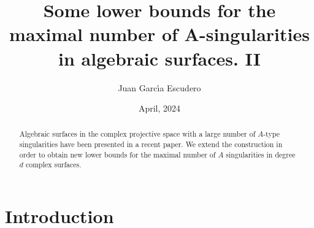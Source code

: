 \documentclass{birkjour_t2}
\theoremstyle{definition}
\theoremstyle{remark}
\numberwithin{equation}{section}
\begin{document}
%
%
%
%
%
%
%
%
%


\title[Lower bounds for A-singularities]{Some lower bounds for the maximal number of A-singularities in algebraic surfaces. II}



\author[J.G.Escudero]{Juan Garc\'{\i}a Escudero}
\address{%
Madrid, Spain
\\
https://orcid.org/0000-0002-7422-7908
}




\date{April,  2024}
\dedicatory{}

\begin{abstract}
Algebraic surfaces in the complex  projective space  with a large number of $A$-type singularities have been presented in a recent paper. We extend the construction in order to obtain new lower bounds for the maximal number of  $A$ singularities in degree $d$ complex surfaces.

\end{abstract}
\maketitle

\section{Introduction}
\bigskip\par
\end{document}
